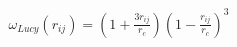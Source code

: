 \pagestyle{empty}


\begin{eqnarray*}
   \omega_{Lucy}\left(r_{ij}\right) = \left( 1 + \frac{3r_{ij}}{r_c} \right) \left( 1 - \frac{r_{ij}}{r_c} \right)^3
\end{eqnarray*}                           


